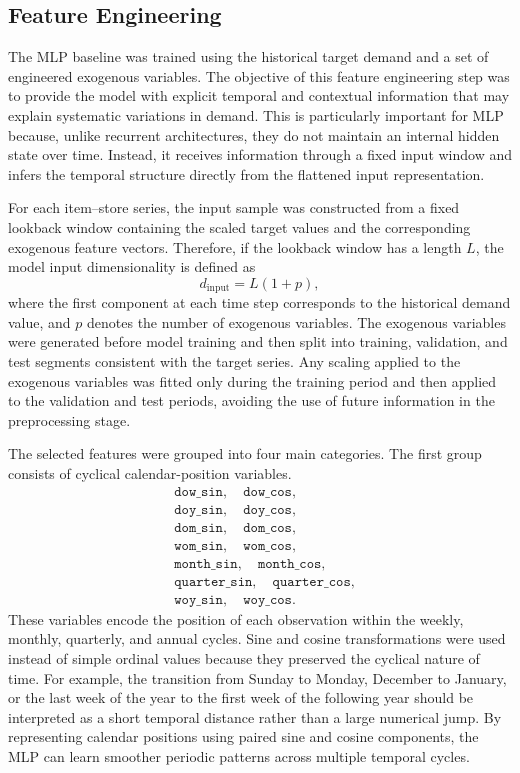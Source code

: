 \subsection{Feature Engineering}
\label{subsec:mlp_feature_engineering}

The MLP baseline was trained using the historical target demand and a set of engineered exogenous variables. The objective of this feature engineering step was to provide the model with explicit temporal and contextual information that may explain systematic variations in demand. This is particularly important for MLP because, unlike recurrent architectures, they do not maintain an internal hidden state over time. Instead, it receives information through a fixed input window and infers the temporal structure directly from the flattened input representation.

For each item--store series, the input sample was constructed from a fixed lookback window containing the scaled target values and the corresponding exogenous feature vectors. Therefore, if the lookback window has a length \(L\), the model input dimensionality is defined as
\[
d_{\text{input}} = L(1+p),
\]
where the first component at each time step corresponds to the historical demand value, and \(p\) denotes the number of exogenous variables. The exogenous variables were generated before model training and then split into training, validation, and test segments consistent with the target series. Any scaling applied to the exogenous variables was fitted only during the training period and then applied to the validation and test periods, avoiding the use of future information in the preprocessing stage.

The selected features were grouped into four main categories. The first group consists of cyclical calendar-position variables.
\[
\begin{split}
&\texttt{dow\_sin},\quad \texttt{dow\_cos},\\
&\texttt{doy\_sin},\quad \texttt{doy\_cos},\\
&\texttt{dom\_sin},\quad \texttt{dom\_cos},\\
&\texttt{wom\_sin},\quad \texttt{wom\_cos},\\
&\texttt{month\_sin},\quad \texttt{month\_cos},\\
&\texttt{quarter\_sin},\quad \texttt{quarter\_cos},\\
&\texttt{woy\_sin},\quad \texttt{woy\_cos}.
\end{split}
\]
These variables encode the position of each observation within the weekly, monthly, quarterly, and annual cycles. Sine and cosine transformations were used instead of simple ordinal values because they preserved the cyclical nature of time. For example, the transition from Sunday to Monday, December to January, or the last week of the year to the first week of the following year should be interpreted as a short temporal distance rather than a large numerical jump. By representing calendar positions using paired sine and cosine components, the MLP can learn smoother periodic patterns across multiple temporal cycles.

